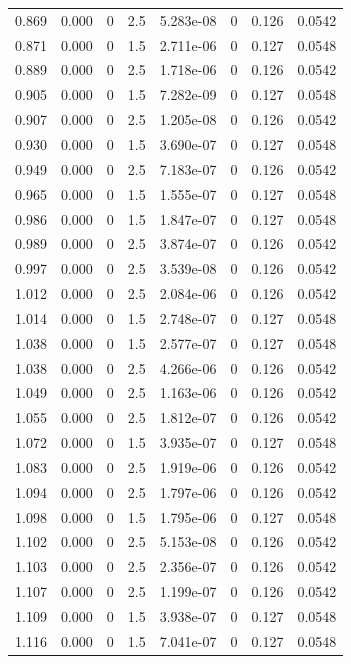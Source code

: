 \documentclass[preview]{standalone}
\begin{document}
{{{\begin{tabular}{L{1.2cm}C{1.2cm} C{0.3cm}C{0.5cm} C{1.4cm}C{1.4cm} C{1.4cm}C{1.4cm}}
  0.869  &  0.000  & 0     & 2.5 &  5.283e-08  & 0  & 0.126 &  0.0542   \\ 
  0.871  &  0.000  & 0     & 1.5 &  2.711e-06  & 0  & 0.127 &  0.0548   \\ 
  0.889  &  0.000  & 0     & 2.5 &  1.718e-06  & 0  & 0.126 &  0.0542   \\ 
  0.905  &  0.000  & 0     & 1.5 &  7.282e-09  & 0  & 0.127 &  0.0548   \\ 
  0.907  &  0.000  & 0     & 2.5 &  1.205e-08  & 0  & 0.126 &  0.0542   \\ 
  0.930  &  0.000  & 0     & 1.5 &  3.690e-07  & 0  & 0.127 &  0.0548   \\ 
  0.949  &  0.000  & 0     & 2.5 &  7.183e-07  & 0  & 0.126 &  0.0542   \\ 
  0.965  &  0.000  & 0     & 1.5 &  1.555e-07  & 0  & 0.127 &  0.0548   \\ 
  0.986  &  0.000  & 0     & 1.5 &  1.847e-07  & 0  & 0.127 &  0.0548   \\ 
  0.989  &  0.000  & 0     & 2.5 &  3.874e-07  & 0  & 0.126 &  0.0542   \\ 
  0.997  &  0.000  & 0     & 2.5 &  3.539e-08  & 0  & 0.126 &  0.0542   \\ 
  1.012  &  0.000  & 0     & 2.5 &  2.084e-06  & 0  & 0.126 &  0.0542   \\ 
  1.014  &  0.000  & 0     & 1.5 &  2.748e-07  & 0  & 0.127 &  0.0548   \\ 
  1.038  &  0.000  & 0     & 1.5 &  2.577e-07  & 0  & 0.127 &  0.0548   \\ 
  1.038  &  0.000  & 0     & 2.5 &  4.266e-06  & 0  & 0.126 &  0.0542   \\ 
  1.049  &  0.000  & 0     & 2.5 &  1.163e-06  & 0  & 0.126 &  0.0542   \\ 
  1.055  &  0.000  & 0     & 2.5 &  1.812e-07  & 0  & 0.126 &  0.0542   \\ 
  1.072  &  0.000  & 0     & 1.5 &  3.935e-07  & 0  & 0.127 &  0.0548   \\ 
  1.083  &  0.000  & 0     & 2.5 &  1.919e-06  & 0  & 0.126 &  0.0542   \\ 
  1.094  &  0.000  & 0     & 2.5 &  1.797e-06  & 0  & 0.126 &  0.0542   \\ 
  1.098  &  0.000  & 0     & 1.5 &  1.795e-06  & 0  & 0.127 &  0.0548   \\ 
  1.102  &  0.000  & 0     & 2.5 &  5.153e-08  & 0  & 0.126 &  0.0542   \\ 
  1.103  &  0.000  & 0     & 2.5 &  2.356e-07  & 0  & 0.126 &  0.0542   \\ 
  1.107  &  0.000  & 0     & 2.5 &  1.199e-07  & 0  & 0.126 &  0.0542   \\ 
  1.109  &  0.000  & 0     & 1.5 &  3.938e-07  & 0  & 0.127 &  0.0548   \\ 
  1.116  &  0.000  & 0     & 1.5 &  7.041e-07  & 0  & 0.127 &  0.0548   \\ 
\hline 
\end{tabular} 

}}}
\end{document}

